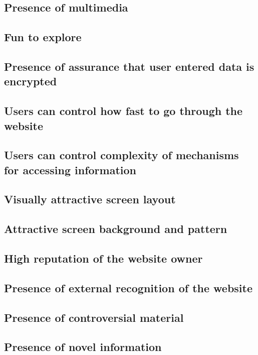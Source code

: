        \subsection{Presence of multimedia}

        \subsection{Fun to explore}

        \subsection{Presence of assurance that user entered data is encrypted}

        \subsection{Users can control how fast to go through the website}

        \subsection{Users can control complexity of mechanisms for accessing information}

        \subsection{Visually attractive screen layout}

        \subsection{Attractive screen background and pattern}

        \subsection{High reputation of the website owner}

        \subsection{Presence of external recognition of the website}

        \subsection{Presence of controversial material}

        \subsection{Presence of novel information}
